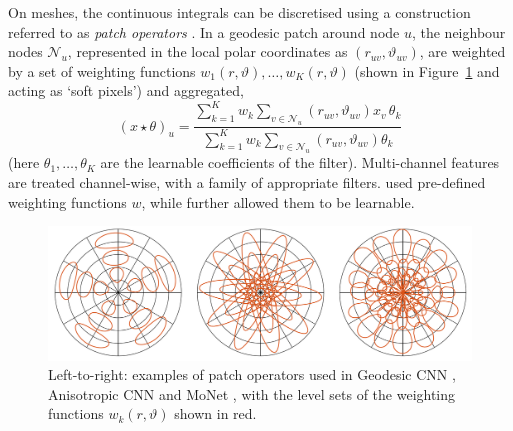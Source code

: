 

On meshes, the continuous integrals can be discretised using a 
construction referred to as {\em patch operators} \citep{masci2015geodesic}. In a geodesic patch around node $u$, the neighbour nodes $\mathcal{N}_u$, represented in the local polar coordinates as $(r_{uv}, \vartheta_{uv})$, are weighted by a set of weighting functions $w_1(r,\vartheta), \hdots, w_K(r,\vartheta)$ (shown in Figure~\ref{fig:patches} and acting as `soft pixels') and aggregated,  
$$
(x\star \theta)_u = \frac{
\sum_{k=1}^K w_{k} \sum_{v\in \mathcal{N}_u} (r_{uv},\vartheta_{uv}) x_v \, \theta_k
}
{
\sum_{k=1}^K w_{k} \sum_{v\in \mathcal{N}_u} (r_{uv},\vartheta_{uv}) \theta_k
}
$$
  (here %
  $\theta_1,\hdots, \theta_K$ are the learnable coefficients of the filter). Multi-channel features are treated channel-wise, with a family of appropriate filters. 
  \cite{masci2015geodesic,boscaini2016learning} used pre-defined weighting functions $w$, while \cite{monti2017geometric} further allowed them to be learnable. 
%




\begin{figure}[h!]
    \centering
    \includegraphics[width=\linewidth]{figures/patch.png}
    \caption{Left-to-right: examples of patch operators used in Geodesic CNN  \citep{masci2015geodesic}, Anisotropic CNN \citep{boscaini2016anisotropic} and MoNet \citep{monti2017geometric}, with the level sets of the weighting functions $w_k(r,\vartheta)$ shown in red. 
    }
    \label{fig:patches}
\end{figure}%






